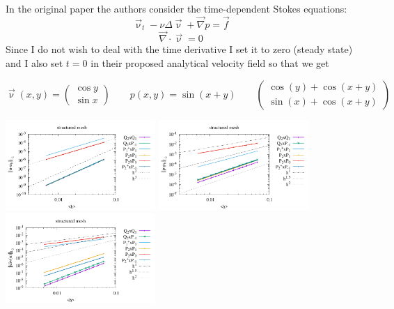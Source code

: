 In the original paper \cite{lire19} the authors consider the time-dependent Stokes equations:
\[
\vec\upnu_t - \nu \Delta \vec\upnu + \vec\nabla p = \vec f 
\]
\[
\vec\nabla \cdot \vec\upnu = 0
\]
Since I do not wish to deal with the time derivative I set it to zero (steady state)
and I also set $t=0$ in their proposed analytical velocity field so that we get

\[
\vec\upnu (x,y) = 
\left(
\begin{array}{c}
\cos y \\
\sin x
\end{array}
\right)
\qquad
p(x,y)=\sin(x+y)
\qquad
\left(
\begin{array}{c}
\cos(y)+\cos(x+y) \\
\sin(x)+\cos(x+y) 
\end{array}
\right)
\]

\begin{center}
\includegraphics[width=5.7cm]{python_codes/fieldstone_120/paperresults/lire19_structured_errorsV.pdf}
\includegraphics[width=5.7cm]{python_codes/fieldstone_120/paperresults/lire19_structured_errorsP.pdf}
\includegraphics[width=5.7cm]{python_codes/fieldstone_120/paperresults/lire19_structured_errors_divv.pdf}\\
\end{center}

